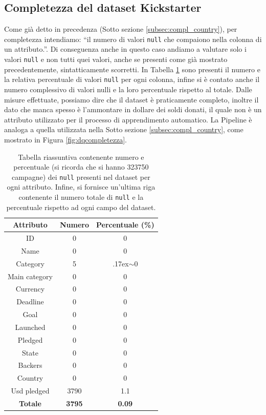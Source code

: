 \newpage
\subsection{Completezza del dataset Kickstarter}
Come già detto in precedenza (Sotto sezione \ref{subsec:compl_country}), per completezza intendiamo: “il numero di valori  \texttt{null} che compaiono nella colonna di un attributo.”.
Di conseguenza anche in questo caso andiamo a valutare solo i valori \texttt{null} e non tutti quei valori, anche se presenti come già mostrato precedentemente, sintatticamente scorretti.
In Tabella \ref{tab:compl_ks} sono presenti il numero e la relativa percentuale di valori \texttt{null} per ogni colonna, infine si è contato anche il numero complessivo di valori nulli e la loro percentuale rispetto al totale.
Dalle misure effettuate, possiamo dire che il dataset è praticamente completo, inoltre il dato che manca spesso è l'ammontare in dollare dei soldi donati, il quale non è un attributo utilizzato per il processo di apprendimento automatico.
La Pipeline è analoga a quella utilizzata nella Sotto sezione \ref{subsec:compl_country}, come mostrato in Figura \ref{fig:dqcompletezza}.
\begin{table}
	\caption{Tabella riassuntiva contenente numero e percentuale (si ricorda che si hanno 323750 campagne) dei \texttt{null} presenti nel dataset per ogni attributo. Infine, si fornisce un'ultima riga contenente il numero totale di \texttt{null} e la percentuale rispetto ad ogni campo del dataset.}
	
	\label{tab:compl_ks}
	
	\centering
	\begin{tabular}{|c|c|c|}
		\hline
		\textbf{Attributo}  & \textbf{Numero} & \textbf{Percentuale (\%)} \\ 
		\hline  
		\rule{0pt}{13pt}ID & 0 & 0 \\ 
		\hline  
		\rule{0pt}{13pt}Name & 0  & 0 \\ 
		\hline  
		\rule{0pt}{13pt}Category & 5 & {\raise.17ex\hbox{$\scriptstyle\sim$}}0 \\ 
		\hline  
		\rule{0pt}{13pt}Main category & 0 & 0 \\ 
		\hline
		\rule{0pt}{13pt}Currency & 0 & 0 \\
		\hline
		\rule{0pt}{13pt}Deadline & 0 & 0 \\
		\hline
		\rule{0pt}{13pt}Goal & 0 & 0 \\
		\hline
		\rule{0pt}{13pt}Launched & 0 & 0 \\
		\hline
		\rule{0pt}{13pt}Pledged & 0 & 0 \\
		\hline
		\rule{0pt}{13pt}State & 0 & 0 \\
		\hline
		\rule{0pt}{13pt}Backers & 0 & 0\\
		\hline
		\rule{0pt}{13pt}Country & 0 & 0 \\
		\hline
		\rule{0pt}{13pt}Usd pledged & 3790 & 1.1 \\
		\hline
		\rule{0pt}{13pt}\textbf{Totale} & \textbf{3795} & \textbf{0.09} \\
		\hline
	\end{tabular}
\end{table}

